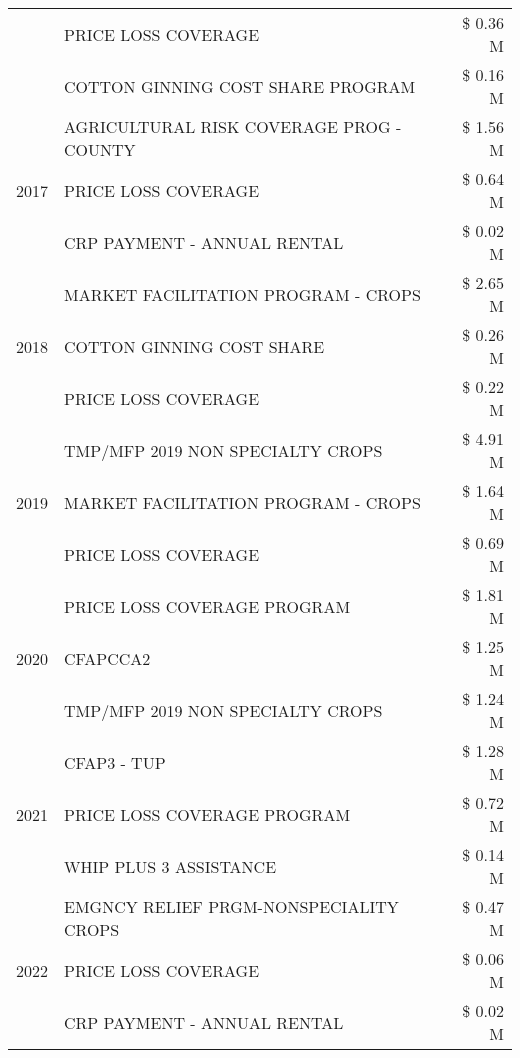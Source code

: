 \begin{tabular}{llr}
 & PRICE LOSS COVERAGE & \$ 0.36 M \\
 & COTTON GINNING COST SHARE PROGRAM & \$ 0.16 M \\
\cline{1-3}
\multirow[t]{3}{*}{2017} & AGRICULTURAL RISK COVERAGE PROG - COUNTY & \$ 1.56 M \\
 & PRICE LOSS COVERAGE & \$ 0.64 M \\
 & CRP PAYMENT - ANNUAL RENTAL & \$ 0.02 M \\
\cline{1-3}
\multirow[t]{3}{*}{2018} & MARKET FACILITATION PROGRAM - CROPS & \$ 2.65 M \\
 & COTTON GINNING COST SHARE & \$ 0.26 M \\
 & PRICE LOSS COVERAGE & \$ 0.22 M \\
\cline{1-3}
\multirow[t]{3}{*}{2019} & TMP/MFP 2019 NON SPECIALTY CROPS & \$ 4.91 M \\
 & MARKET FACILITATION PROGRAM - CROPS & \$ 1.64 M \\
 & PRICE LOSS COVERAGE & \$ 0.69 M \\
\cline{1-3}
\multirow[t]{3}{*}{2020} & PRICE LOSS COVERAGE PROGRAM & \$ 1.81 M \\
 & CFAPCCA2 & \$ 1.25 M \\
 & TMP/MFP 2019 NON SPECIALTY CROPS & \$ 1.24 M \\
\cline{1-3}
\multirow[t]{3}{*}{2021} & CFAP3 - TUP & \$ 1.28 M \\
 & PRICE LOSS COVERAGE PROGRAM & \$ 0.72 M \\
 & WHIP PLUS 3 ASSISTANCE & \$ 0.14 M \\
\cline{1-3}
\multirow[t]{3}{*}{2022} & EMGNCY RELIEF PRGM-NONSPECIALITY CROPS & \$ 0.47 M \\
 & PRICE LOSS COVERAGE & \$ 0.06 M \\
 & CRP PAYMENT - ANNUAL RENTAL & \$ 0.02 M \\
\cline{1-3}
\bottomrule
\end{tabular}
